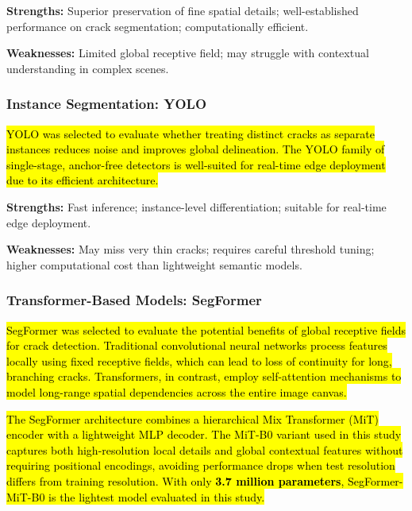 \textbf{Strengths:} Superior preservation of fine spatial details; well-established performance on crack segmentation; computationally efficient.

\textbf{Weaknesses:} Limited global receptive field; may struggle with contextual understanding in complex scenes.

\subsubsection{Instance Segmentation: YOLO}

\hs \hl{YOLO was selected to evaluate whether treating distinct cracks as separate instances reduces noise and improves global delineation. The YOLO family of single-stage, anchor-free detectors is well-suited for real-time edge deployment due to its efficient architecture.}

\hs {}

\textbf{Strengths:} Fast inference; instance-level differentiation; suitable for real-time edge deployment.

\textbf{Weaknesses:} May miss very thin cracks; requires careful threshold tuning; higher computational cost than lightweight semantic models.

\subsubsection{Transformer-Based Models: SegFormer}

\hs \hl{SegFormer was selected to evaluate the potential benefits of global receptive fields for crack detection. Traditional convolutional neural networks process features locally using fixed receptive fields, which can lead to loss of continuity for long, branching cracks. Transformers, in contrast, employ self-attention mechanisms to model long-range spatial dependencies across the entire image canvas.}

\hs \hl{The SegFormer architecture combines a hierarchical Mix Transformer (MiT) encoder with a lightweight MLP decoder. The MiT-B0 variant used in this study captures both high-resolution local details and global contextual features without requiring positional encodings, avoiding performance drops when test resolution differs from training resolution. With only \textbf{3.7 million parameters}, SegFormer-MiT-B0 is the lightest model evaluated in this study.}

